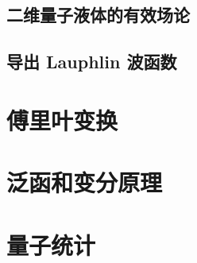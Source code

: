 \documentclass[b5paper]{book}
\begin{document}
\section{二维量子液体的有效场论}
\section{导出 Lauphlin 波函数}

\begin{appendix}
\chapter{傅里叶变换}
\chapter{泛函和变分原理}
\chapter{量子统计}
\end{appendix}
\end{document}
